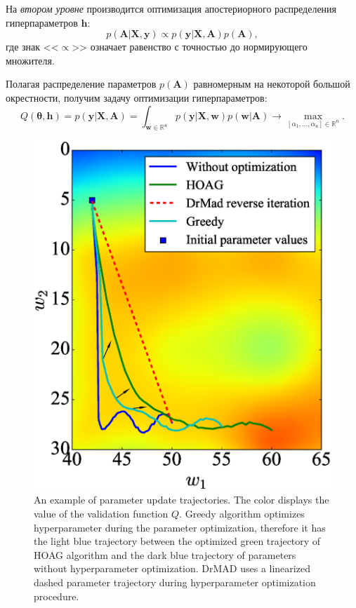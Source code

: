 На \textit{втором уровне} производится оптимизация апостериорного распределения гиперпараметров $\mathbf{h}$:
\[
p(\mathbf{A}|\mathbf{X}, \mathbf{y}) \propto p(\mathbf{y}|\mathbf{X},\mathbf{A})p(\mathbf{A}),
\]
где знак <<$\propto$>> означает равенство с точностью до нормирующего множителя.

Полагая распределение параметров $p(\mathbf{A})$ равномерным на некоторой большой окрестности, получим задачу оптимизации гиперпараметров:
\begin{equation}
\label{eq:bayes2}
	Q(\boldsymbol{\theta}, \mathbf{h}) = p(\mathbf{y}|\mathbf{X},\mathbf{A}) = \int_{\mathbf{w} \in \mathbb{R}^u} p(\mathbf{y}|\mathbf{X}, \mathbf{w}) p(\mathbf{w}|\mathbf{A}) \to \max_{[\alpha_1, \dots, \alpha_u] \in \mathbb{R}^{n}}.
\end{equation}


\begin{figure}
  \includegraphics[width=0.8\linewidth]{plots/hyperparams/Fig_traj.eps}

    \caption{An example of parameter update trajectories. The color displays the value of the validation function $Q$. Greedy algorithm optimizes hyperparameter during the parameter optimization, therefore it has the light blue trajectory between the optimized green trajectory of HOAG algorithm and the dark blue trajectory of parameters without hyperparameter optimization. DrMAD uses a linearized dashed parameter trajectory during hyperparameter optimization procedure. }
 \label{fig:traj}
   
    \end{figure}


